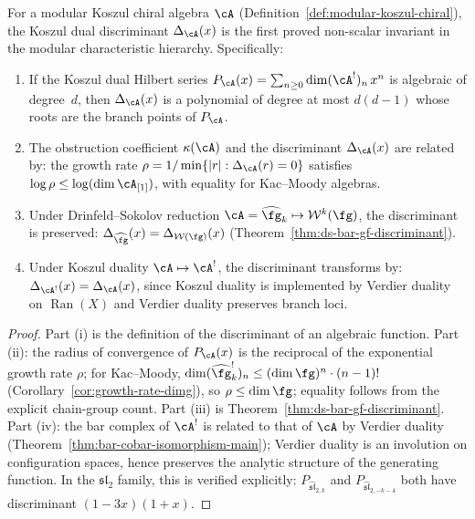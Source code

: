 \begin{proposition}
\label{prop:discriminant-characteristic}
For a modular Koszul chiral algebra $\cA$
\textup{(}Definition~\textup{\ref{def:modular-koszul-chiral})},
the Koszul dual discriminant $\Delta_{\cA}(x)$ is the first proved
non-scalar invariant in the modular characteristic hierarchy.
Specifically:
\begin{enumerate}[label=\textup{(\roman*)}]
\item If the Koszul dual Hilbert series
  $P_{\cA}(x) = \sum_{n \geq 0} \dim (\cA^!)_n\, x^n$
  is algebraic of degree~$d$, then $\Delta_{\cA}(x)$ is a polynomial
  of degree at most $d(d-1)$ whose roots are the branch points
  of $P_{\cA}$.
\item The obstruction coefficient $\kappa(\cA)$ and
  the discriminant $\Delta_{\cA}(x)$ are related by: the growth
  rate $\rho = 1/\min\{|r| : \Delta_{\cA}(r) = 0\}$ satisfies
  $\log \rho \leq \log(\dim \cA_{[1]})$, with equality for
  Kac--Moody algebras.
\item Under Drinfeld--Sokolov reduction $\cA = \widehat{\fg}_k
  \mapsto \mathcal{W}^k(\fg)$, the discriminant is preserved:
  $\Delta_{\widehat{\fg}}(x) = \Delta_{\mathcal{W}(\fg)}(x)$
  \textup{(}Theorem~\textup{\ref{thm:ds-bar-gf-discriminant})}.
\item Under Koszul duality $\cA \mapsto \cA^!$, the discriminant
  transforms by: $\Delta_{\cA^!}(x) = \Delta_{\cA}(x)$, since
  Koszul duality is implemented by Verdier duality on
  $\operatorname{Ran}(X)$ and Verdier duality preserves branch
  loci.
\end{enumerate}
\end{proposition}

\begin{proof}
Part (i) is the definition of the discriminant of an algebraic function.
Part (ii): the radius of convergence of $P_{\cA}(x)$ is the
reciprocal of the exponential growth rate $\rho$; for Kac--Moody,
$\dim (\widehat{\fg}_k^!)_n \leq (\dim \fg)^n \cdot (n-1)!$
(Corollary~\ref{cor:growth-rate-dimg}), so $\rho \leq \dim \fg$;
equality follows from the explicit chain-group count.
Part (iii) is Theorem~\ref{thm:ds-bar-gf-discriminant}.
Part (iv): the bar complex of $\cA^!$ is related to that of $\cA$
by Verdier duality
(Theorem~\ref{thm:bar-cobar-isomorphism-main}); Verdier duality
is an involution on configuration spaces, hence preserves the
analytic structure of the generating function.  In the
$\mathfrak{sl}_2$ family, this is verified explicitly:
$P_{\widehat{\mathfrak{sl}}_{2,k}}$ and
$P_{\widehat{\mathfrak{sl}}_{2,-k-4}}$ both have discriminant
$(1-3x)(1+x)$.
\end{proof}

